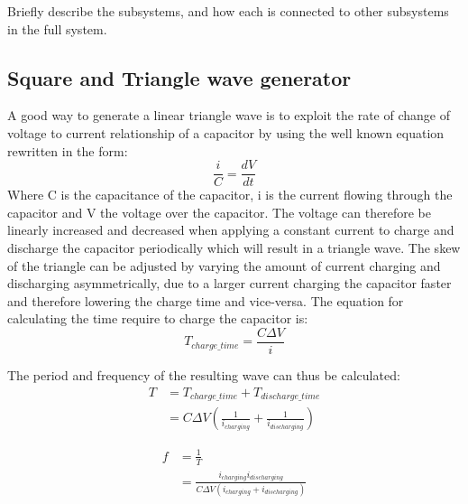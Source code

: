 \documentclass[11pt,a4paper]{article}
\begin{document}
Briefly describe the subsystems, and how each is connected to other subsystems in the full system.

\subsection{Square and Triangle wave generator}

A good way to generate a linear triangle wave is to exploit the rate of change of voltage to current relationship of a capacitor by using the well known equation rewritten in the form\cite{CAP_IND:2006}:
\begin{equation}
	\frac{i}{C} =\frac{dV}{dt} 
	\label{eq:Capacitor charge}
\end{equation}
Where C is the capacitance of the capacitor, i is the current flowing through the capacitor and V the voltage over the capacitor. The voltage can therefore be linearly increased and decreased when applying a constant current to charge and discharge the capacitor periodically which will result in a triangle wave. The skew of the triangle can be adjusted by varying the amount of current charging and discharging asymmetrically, due to a larger current charging the capacitor faster and therefore lowering the charge time and vice-versa.  The equation for calculating the time require to charge the capacitor is:
\begin{equation}
	T_{charge\_time} = \frac{C\Delta{V}}{i} 
	\label{eq:Capacitor charge time}
\end{equation}

The period and frequency of the resulting wave can thus be calculated:
\begin{equation}
	\begin{split}
	T &= T_{charge\_time} + T_{discharge\_time} \\
	   &= C\Delta{V} (\frac{1}{i_{charging}} + \frac{1}{i_{discharging}})
	\label{eq:Square and triangle period}
	\end{split}
\end{equation}

\begin{equation}
	\begin{split}
		f &= \frac{1}{T}  \\
		  &= \frac{i_{charging}i_{discharging}}{C\Delta{V} (i_{charging} + i_{discharging})}
		\label{eq:Square and triangle frequency}
	\end{split}
\end{equation}
\end{document}
